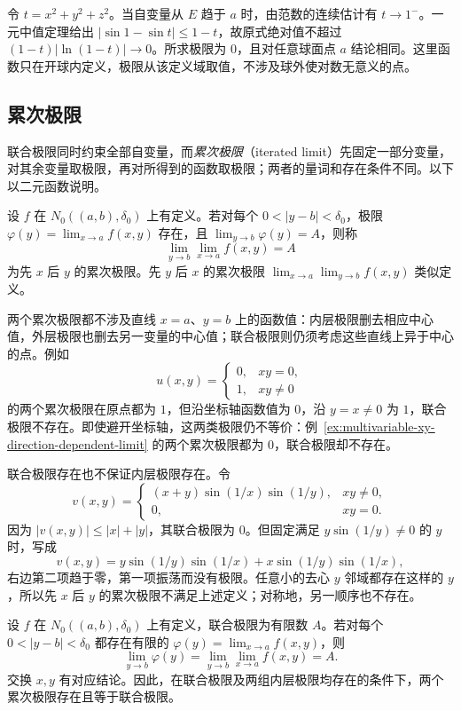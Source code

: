 \documentclass[UTF8,12pt,a4paper,fontset=fandol]{ctexbook}
\begin{document}
\begin{solve}
令 $t=x^2+y^2+z^2$。当自变量从 $E$ 趋于 $a$ 时，由范数的连续估计有 $t\to1^-$。一元中值定理给出 $|\sin1-\sin t|\leq1-t$，故原式绝对值不超过 $(1-t)|\ln(1-t)|\to0$。所求极限为 $0$，且对任意球面点 $a$ 结论相同。这里函数只在开球内定义，极限从该定义域取值，不涉及球外使对数无意义的点。
\end{solve}

\subsection{累次极限}
\label{subsec:iterated-limits}

联合极限同时约束全部自变量，而\emph{累次极限}（iterated limit）先固定一部分变量，对其余变量取极限，再对所得到的函数取极限；两者的量词和存在条件不同。以下以二元函数说明。

\begin{definition}
\label{def:iterated-multivariable-limits}
设 $f$ 在 $N_0((a,b),\delta_0)$ 上有定义。若对每个 $0<|y-b|<\delta_0$，极限 $\varphi(y)=\lim_{x\to a}f(x,y)$ 存在，且 $\lim_{y\to b}\varphi(y)=A$，则称
\[
    \lim_{y\to b}\lim_{x\to a}f(x,y)=A
\]
为先 $x$ 后 $y$ 的累次极限。先 $y$ 后 $x$ 的累次极限 $\lim_{x\to a}\lim_{y\to b}f(x,y)$ 类似定义。
\end{definition}

两个累次极限都不涉及直线 $x=a$、$y=b$ 上的函数值：内层极限删去相应中心值，外层极限也删去另一变量的中心值；联合极限则仍须考虑这些直线上异于中心的点。例如
\[
    u(x,y)=\begin{cases}0,&xy=0,\\1,&xy\neq0\end{cases}
\]
的两个累次极限在原点都为 $1$，但沿坐标轴函数值为 $0$，沿 $y=x\neq0$ 为 $1$，联合极限不存在。即使避开坐标轴，这两类极限仍不等价：例~\ref{ex:multivariable-xy-direction-dependent-limit} 的两个累次极限都为 $0$，联合极限却不存在。

联合极限存在也不保证内层极限存在。令
\[
    v(x,y)=\begin{cases}
        (x+y)\sin(1/x)\sin(1/y),&xy\neq0,\\
        0,&xy=0.
    \end{cases}
\]
因为 $|v(x,y)|\leq|x|+|y|$，其联合极限为 $0$。但固定满足 $y\sin(1/y)\neq0$ 的 $y$ 时，写成
\[
    v(x,y)=y\sin(1/y)\sin(1/x)+x\sin(1/y)\sin(1/x),
\]
右边第二项趋于零，第一项振荡而没有极限。任意小的去心 $y$ 邻域都存在这样的 $y$，所以先 $x$ 后 $y$ 的累次极限不满足上述定义；对称地，另一顺序也不存在。

\begin{theorem}[联合极限与已有的内层极限]
\label{thm:joint-limit-implies-existing-iterated-limit}
设 $f$ 在 $N_0((a,b),\delta_0)$ 上有定义，联合极限为有限数 $A$。若对每个 $0<|y-b|<\delta_0$ 都存在有限的 $\varphi(y)=\lim_{x\to a}f(x,y)$，则
\[
    \lim_{y\to b}\varphi(y)
       =\lim_{y\to b}\lim_{x\to a}f(x,y)=A.
\]
交换 $x,y$ 有对应结论。因此，在联合极限及两组内层极限均存在的条件下，两个累次极限存在且等于联合极限。
\end{theorem}
\end{document}
